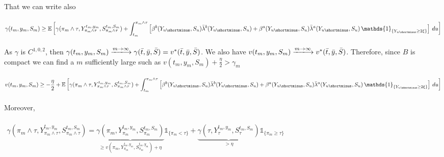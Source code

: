 \documentclass[8pt]{article}
\begin{document}
\\ \\
That we can write also 
\\ \\
$\begin{aligned}
\gamma(t_m, y_m, S_m) \geq \mathbb{E}\left[\gamma(\pi_m \wedge \tau, Y^{t_m, y_m}_{\pi_m \wedge \tau}, S^{t_m, S_m}_{\pi_m \wedge \tau}) + \int_{t_m}^{\pi_m \wedge \tau}  \left[\beta^b(Y_{u\shortminus},S_u) \bar{\lambda}^b(Y_{u\shortminus}, S_u) + \beta^a(Y_{u\shortminus},S_u) \bar{\lambda}^a(Y_{u\shortminus}, S_u) \, \mathds{1}_{\{Y_{u\shortminus} \ge 2\xi\}}\right] \, du \right] \\
\end{aligned}$
\\ \\
As $\gamma$ is $C^{1,0,2}$, then $\gamma(t_m, y_m, S_m) \xlongrightarrow{m \to \infty} \gamma(\bar{t}, \bar{y}, \bar{S}) = v^*(\bar{t}, \bar{y}, \bar{S})$. We also have $v(t_m, y_m, S_m) \xlongrightarrow{m \to \infty} v^{*}(\bar{t}, \bar{y}, \bar{S})$. Therefore, since $B$ is compact we can find a $m$ sufficiently large such as $v(t_m, y_m, S_m) + \frac{\eta}{2} > \gamma_m$
\\ \\
$\begin{aligned}
v(t_m, y_m, S_m) \geq -\frac{\eta}{2} + \mathbb{E}\left[\gamma(\pi_m \wedge \tau, Y^{t_m, y_m}_{\pi_m \wedge \tau}, S^{t_m, S_m}_{\pi_m \wedge \tau}) + \int_{t_m}^{\pi_m \wedge \tau}  \left[\beta^b(Y_{u\shortminus},S_u) \bar{\lambda}^b(Y_{u\shortminus}, S_u) + \beta^a(Y_{u\shortminus},S_u) \bar{\lambda}^a(Y_{u\shortminus}, S_u) \, \mathds{1}_{\{Y_{u\shortminus} \ge 2\xi\}}\right] \, du \right] \\
\end{aligned}$
\\ \\
Moreover,
\\ \\
$\begin{aligned}
\gamma(\pi_m \wedge \tau, Y^{t_m, y_m}_{\pi_m \wedge \tau}, S^{t_m, S_m}_{\pi_m \wedge \tau}) = \underbrace{\gamma(\pi_m, Y^{t_m, y_m}_{\pi_m}, S^{t_m, S_m}_{\pi_m})}_{\geq v(\pi_m, Y^{t_m, y_m}_{\pi_m}, S^{t_m, y_m}_{\pi_m}) + \eta} \mathds{1}_{\{\pi_m < \tau\}} + \underbrace{\gamma(\tau, Y^{t_m, y_m}_{\tau}, S^{t_m, S_m}_{\tau})}_{> \eta}\mathds{1}_{\{\pi_m \geq \tau\}} \\
\end{aligned}$
\\ \\ \\
\end{document}
